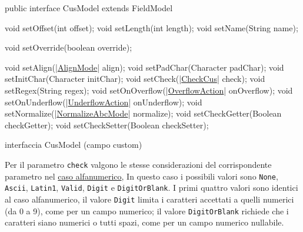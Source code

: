 \documentclass[a4paper,10pt]{report}
\newif\ifesource
\newenvironment{elisting}[1][!htb]
  {\captionsetup{aboveskip=0pt}\begin{listing}[#1]}
  {\end{listing}%
}
\begin{document}
\ifesource
\begin{figure*}[!htb]
\begin{lstlisting}[language=java, 
caption=interfaccia CusModel (campo custom), 
label=lst:CusModel]
public interface CusModel extends FieldModel {
    void setOffset(int offset);
    void setLength(int length);
    void setName(String name);
    
    void setOverride(boolean override);
    
    void setAlign((*\hyperref[lst:AlignMode]{AlignMode}*) align);
    void setPadChar(Character padChar);
    void setInitChar(Character initChar);
    void setCheck((*\hyperref[lst:CheckCus]{CheckCus}*) check);
    void setRegex(String regex);
    void setOnOverflow((*\hyperref[lst:OverflowAction]{OverflowAction}*) onOverflow);
    void setOnUnderflow((*\hyperref[lst:UnderflowAction]{UnderflowAction}*) onUnderflow);
    void setNormalize((*\hyperref[lst:NormalizeAbcMode]{NormalizeAbcMode}*) normalize);
    void setCheckGetter(Boolean checkGetter);
    void setCheckSetter(Boolean checkSetter);
}
\end{lstlisting}\index{CusModel}
\end{figure*}
\else
\begin{elisting}
\begin{javacode}
public interface CusModel extends FieldModel {
    void setOffset(int offset);
    void setLength(int length);
    void setName(String name);
    
    void setOverride(boolean override);
    
    void setAlign(|\hyperref[lst:AlignMode]{AlignMode}| align);
    void setPadChar(Character padChar);
    void setInitChar(Character initChar);
    void setCheck(|\hyperref[lst:CheckCus]{CheckCus}| check);
    void setRegex(String regex);
    void setOnOverflow(|\hyperref[lst:OverflowAction]{OverflowAction}| onOverflow);
    void setOnUnderflow(|\hyperref[lst:UnderflowAction]{UnderflowAction}| onUnderflow);
    void setNormalize(|\hyperref[lst:NormalizeAbcMode]{NormalizeAbcMode}| normalize);
    void setCheckGetter(Boolean checkGetter);
    void setCheckSetter(Boolean checkSetter);
}
\end{javacode}
\caption{interfaccia CusModel (campo custom)}
\label{lst:CusModel}
\end{elisting}
\fi

Per il parametro \verb!check! valgono le stesse considerazioni del 
corrispondente parametro nel \hyperlink{abc:chk}{caso alfanumerico},
In questo caso i possibili valori sono \verb!None!, \verb!Ascii!, \verb!Latin1!, 
\verb!Valid!, \verb!Digit! e \verb!DigitOrBlank!.
I primi quattro valori sono identici al caso alfanumerico, il valore 
\verb!Digit! limita i caratteri accettati a quelli numerici (da 0 a 9), come
per un campo numerico; il valore \verb!DigitOrBlank! richiede che i caratteri
siano numerici o tutti spazi, come per un campo numerico nullabile.
\end{document}
